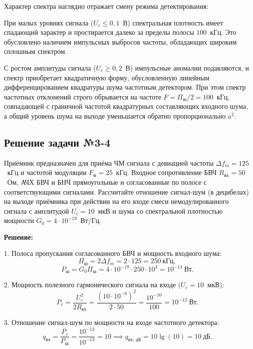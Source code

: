 Характер спектра наглядно отражает смену режима детектирования:

При малых уровнях сигнала ($U_c \le 0{,}1$~В) спектральная плотность имеет спадающий характер и простирается далеко за пределы полосы $100$~кГц. Это обусловлено наличием импульсных выбросов частоты, обладающих широким сплошным спектром.

С ростом амплитуды сигнала ($U_c \ge 0{,}2$~В) импульсные аномалии подавляются, и спектр приобретает квадратичную форму, обусловленную линейным дифференцированием квадратуры шума частотным детектором. При этом спектр частотных отклонений строго обрывается на частоте $F = \Pi_{\text{ш}}/2 = 100$~кГц, совпадающей с граничной частотой квадратурных составляющих входного шума, а общий уровень шума на выходе уменьшается обратно пропорционально $a^2$.

\subsection{Решение задачи №3-4}

Приёмник предназначен для приёма ЧМ сигнала с девиацией частоты $\Delta f_m = 125$~кГц и частотой модуляции $F_{\text{м}} = 25$~кГц. Входное сопротивление БВЧ $R_{\text{вх}} = 50$~Ом, АЧХ БВЧ и БНЧ прямоугольные и согласованные по полосе с соответствующими сигналами. Рассчитайте отношение сигнал-шум (в децибелах) на выходе приёмника при действии на его входе смеси немодулированного сигнала с амплитудой $U_c = 10$~мкВ и шума со спектральной плотностью мощности $G_0 = 4\cdot 10^{-19}$~Вт/Гц.

\medskip
\noindent\textbf{Решение:}

1. Полоса пропускания согласованного БВЧ и мощность входного шума:
\begin{equation}
    \Pi_{\text{ш}} = 2\Delta f_m = 2 \cdot 125 = 250~\text{кГц},
\end{equation}
\begin{equation}
    P_{\text{ш}} = G_0 \Pi_{\text{ш}} = 4 \cdot 10^{-19} \cdot 250 \cdot 10^3 = 10^{-13}~\text{Вт}.
\end{equation}

2. Мощность полезного гармонического сигнала на входе ($U_c = 10$~мкВ):
\begin{equation}
    P_c = \frac{U_c^2}{2 R_{\text{вх}}} = \frac{(10 \cdot 10^{-6})^2}{2 \cdot 50} = \frac{10^{-10}}{100} = 10^{-12}~\text{Вт}.
\end{equation}

3. Отношение сигнал-шум по мощности на входе частотного детектора:
\begin{equation}
    q_{\text{вх}} = \frac{P_c}{P_{\text{ш}}} = \frac{10^{-12}}{10^{-13}} = 10 \implies q_{\text{вх, дБ}} = 10 \lg(10) = 10~\text{дБ}.
\end{equation}

